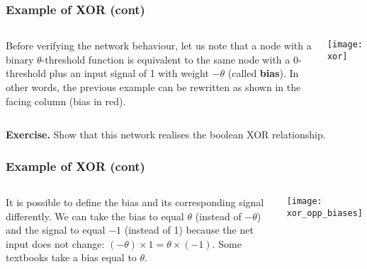 %
\begin{frame}
\frametitle{Example of XOR (cont)}
\label{xor_graph}

\begin{columns}[c]

    Before verifying the network behaviour, let us note that a node
    with a binary \(\theta\)-threshold function is equivalent to the
    same node with a 0-threshold plus an input signal of 1 with weight
    \(-\theta\) (called \textbf{bias}). In other words, the previous
    example can be rewritten as shown in the facing column (bias in
    red).

    \begin{center}
      \texttt{[image: xor]}
    \end{center}

\end{columns}

\bigskip

\textbf{Exercise.} Show that this network realises the boolean XOR
relationship.

\end{frame}

%
\begin{frame}
\frametitle{Example of XOR (cont)}

\begin{columns}[c]

   It is possible to define the bias and its
  corresponding signal differently. We can take the bias to equal
  \(\theta\) (instead of \(-\theta\)) and the signal to equal \(-1\)
  (instead of 1) because the net input does not change: \((-\theta)
  \times 1 = \theta \times (-1)\). Some textbooks take a bias equal to
  \(\theta\).

    \begin{center}
      \texttt{[image: xor\_opp\_biases]}
    \end{center}

\end{columns}

\end{frame}

